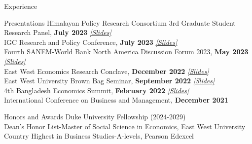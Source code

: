 \documentclass[
	9pt, %
]{resume} %
\begin{document}
\begin{rSection}{Experience}
	\vspace{-10pt}
\begin{rSection}{Presentations} 
	Himalayan Policy Research Consortium 3rd Graduate Student Research Panel, \textbf{July 2023} \textit{\href{https://drive.google.com/file/d/1c9OJ8KnxRb3NdGvUFLuZDAEZU23Q6XjM/view?usp=sharing}{[Slides]}}  \\
	IGC Research and Policy Conference, \textbf{July 2023} \textit{\href{https://drive.google.com/file/d/1tcRIY8yxC01FdsVJsKmR4vaRdW0Yn3bb/view?usp=sharing}{[Slides]}}  \\
	Fourth SANEM-World Bank North America Discussion Forum 2023, \textbf{May 2023} \textit{\href{https://drive.google.com/file/d/1qjbrjKkHRWeoh3wKIsvkR1mJkWT9Fw9N/view?usp=sharing}{[Slides]}}  \\
	East West Economics Research Conclave, \textbf{December 2022}  \textit{\href{https://drive.google.com/file/d/1TUbtHcgI-sgZE9GFSnNAmb4yfXD8yjDS/view?usp=sharing}{[Slides]}}  \\ 
	East West University Brown Bag Seminar, \textbf{September 2022} \textit{\href{https://drive.google.com/file/d/1tOFNpG46qjF2K_2QMGyzyqxcxz4gJK2q/view?usp=sharing}{[Slides]}}  \\ 
	4th Bangladesh Economics Summit, \textbf{February 2022} \textit{\href{https://drive.google.com/file/d/1tmlU19aaJJR7mLwPncVduP_Gg7TQjVrH/view?usp=sharing}{[Slides]}}  \\ 
	International Conference on Business and Management, \textbf{December 2021} 
\end{rSection}


	\vspace{-6pt}
\begin{rSection}{Honors and Awards} 
	Duke University Fellowship (2024-2029) \\
	Dean's Honor List-Master of Social Science in Economics, East West University \\
	Country Highest in Business Studies-A-levels,  Pearson Edexcel
\end{rSection}



\end{rSection}
\end{document}
